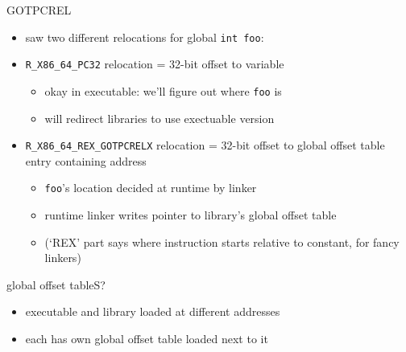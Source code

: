 \begin{frame}{GOTPCREL}
    \begin{itemize}
    \item saw two different relocations for global \texttt{int foo}:
    \item \texttt{R\_X86\_64\_PC32} relocation = 32-bit offset to variable
        \begin{itemize}
        \item okay in executable: we'll figure out where \texttt{foo} is
        \item will redirect libraries to use exectuable version
        \end{itemize}
    \item \texttt{R\_X86\_64\_REX\_GOTPCRELX} relocation = 32-bit offset to global offset table entry containing address
        \begin{itemize}
        \item \texttt{foo}'s location decided at runtime by linker
        \item runtime linker writes pointer to library's global offset table
        \item (`REX' part says where instruction starts relative to constant, for fancy linkers)
        \end{itemize}
    \end{itemize}
\end{frame}

\begin{frame}{global offset tableS?}
    \begin{itemize}
    \item executable and library loaded at different addresses
    \item each has own global offset table loaded next to it
    \end{itemize}
\end{frame}
